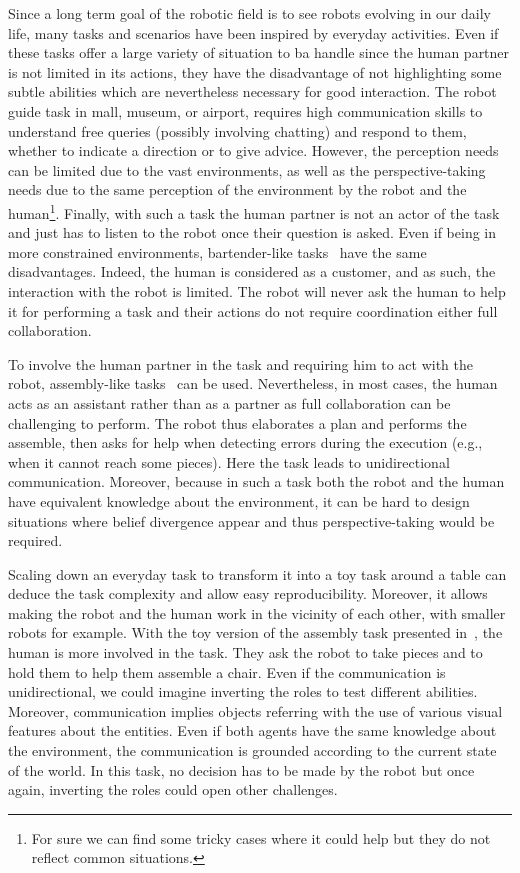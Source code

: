 Since a long term goal of the robotic field is to see robots evolving in our daily life, many tasks and scenarios have been inspired by everyday activities. Even if these tasks offer a large variety of situation to ba handle since the human partner is not limited in its actions, they have the disadvantage of not highlighting some subtle abilities which are nevertheless necessary for good interaction.
The robot guide task \cite{satake_2015_should} in mall, museum, or airport, requires high communication skills to understand free queries (possibly involving chatting) and respond to them, whether to indicate a direction or to give advice. However, the perception needs can be limited due to the vast environments, as well as the perspective-taking needs due to the same perception of the environment by the robot and the human\footnote{For sure we can find some tricky cases where it could help but they do not reflect common situations.}. Finally, with such a task the human partner is not an actor of the task and just has to listen to the robot once their question is asked. Even if being in more constrained environments, bartender-like tasks~\cite{petrick_2012_social} have the same disadvantages. Indeed, the human is considered as a customer, and as such, the interaction with the robot is limited. The robot will never ask the human to help it for performing a task and their actions do not require coordination either full collaboration.

To involve the human partner in the task and requiring him to act with the robot, assembly-like tasks~\cite{tellex_2014_asking} can be used. Nevertheless, in most cases, the human acts as an assistant rather than as a partner as full collaboration can be challenging to perform. The robot thus elaborates a plan and performs the assemble, then asks for help when detecting errors during the execution (e.g., when it cannot reach some pieces). Here the task leads to unidirectional communication. Moreover, because in such a task both the robot and the human have equivalent knowledge about the environment, it can be hard to design situations where belief divergence appear and thus perspective-taking would be required.

Scaling down an everyday task to transform it into a toy task around a table can deduce the task complexity and allow easy reproducibility. Moreover, it allows making the robot and the human work in the vicinity of each other, with smaller robots for example. With the toy version of the assembly task presented in~\cite{brawer_2018_situated}, the human is more involved in the task. They ask the robot to take pieces and to hold them to help them assemble a chair. Even if the communication is unidirectional, we could imagine inverting the roles to test different abilities. Moreover, communication implies objects referring with the use of various visual features about the entities. Even if both agents have the same knowledge about the environment, the communication is grounded according to the current state of the world. In this task, no decision has to be made by the robot but once again, inverting the roles could open other challenges.

